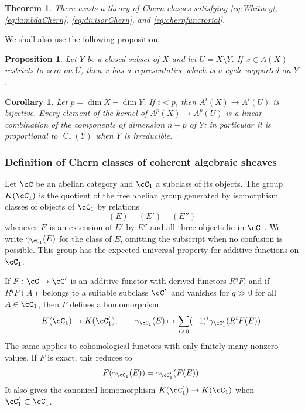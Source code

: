 \documentclass[11pt]{article}
\theoremstyle{plain}
\newtheorem*{theorem*}{Theorem}
\newtheorem*{proposition*}{Proposition}
\newtheorem*{corollary*}{Corollary}
\theoremstyle{definition}
\theoremstyle{remark}
\providecommand{\Cl}{\operatorname{Cl}}
\begin{document}
\begin{theorem*}
There exists a theory of Chern classes satisfying \eqref{eq:Whitney}, \eqref{eq:lambdaChern}, \eqref{eq:divisorChern}, and \eqref{eq:chernfunctorial}.
\end{theorem*}

We shall also use the following proposition.

\begin{proposition*}
Let $Y$ be a closed subset of $X$ and let $U=X\setminus Y$. If $x\in A(X)$ restricts to zero on $U$, then $x$ has a representative which is a cycle supported on $Y$.
\end{proposition*}

\begin{corollary*}
Let $p=\dim X-\dim Y$. If $i<p$, then $A^i(X)\to A^i(U)$ is bijective. Every element of the kernel of $A^p(X)\to A^p(U)$ is a linear combination of the components of dimension $n-p$ of $Y$; in particular it is proportional to $\Cl(Y)$ when $Y$ is irreducible.
\end{corollary*}

\subsubsection{Definition of Chern classes of coherent algebraic sheaves}

Let $\cC$ be an abelian category and $\cC_1$ a subclass of its objects. The group $K(\cC_1)$ is the quotient of the free abelian group generated by isomorphism classes of objects of $\cC_1$ by relations
\[
   (E)-(E')-(E'')
\]
whenever $E$ is an extension of $E'$ by $E''$ and all three objects lie in $\cC_1$. We write $\gamma_{\cC_1}(E)$ for the class of $E$, omitting the subscript when no confusion is possible. This group has the expected universal property for additive functions on $\cC_1$.

If $F:\cC\to\cC'$ is an additive functor with derived functors $R^qF$, and if $R^qF(A)$ belongs to a suitable subclass $\cC'_1$ and vanishes for $q\gg0$ for all $A\in\cC_1$, then $F$ defines a homomorphism
\begin{equation}\label{eq:derivedKfunctor}
   K(\cC_1)\to K(\cC'_1),
   \qquad
   \gamma_{\cC_1}(E)\mapsto
   \sum_{i\geq0}(-1)^i\gamma_{\cC'_1}(R^iF(E)).
\end{equation}
The same applies to cohomological functors with only finitely many nonzero values. If $F$ is exact, this reduces to
\[
   F(\gamma_{\cC_1}(E))=\gamma_{\cC'_1}(F(E)).
\]
It also gives the canonical homomorphism $K(\cC'_1)\to K(\cC_1)$ when $\cC'_1\subset\cC_1$.
\end{document}

